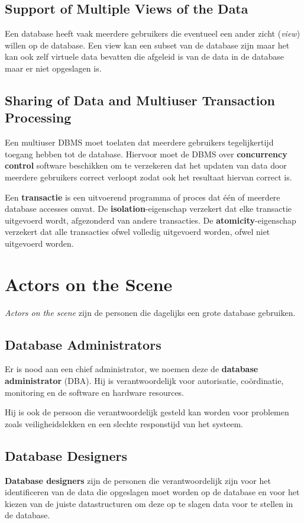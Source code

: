 \subsection{Support of Multiple Views of the Data}
Een database heeft vaak meerdere gebruikers die eventueel een ander zicht (\textit{view}) willen op de database. Een view kan een subset van de database zijn maar het kan ook zelf virtuele data bevatten die afgeleid is van de data in de database maar er niet opgeslagen is. 

\subsection{Sharing of Data and Multiuser Transaction Processing}
Een multiuser DBMS moet toelaten dat meerdere gebruikers tegelijkertijd toegang hebben tot de database. Hiervoor moet de DBMS over \textbf{concurrency control} software beschikken om te verzekeren dat het updaten van data door meerdere gebruikers correct verloopt zodat ook het resultaat hiervan correct is.

Een \textbf{transactie} is een uitvoerend programma of proces dat \'e\'en of meerdere database accesses omvat. De \textbf{isolation}-eigenschap verzekert dat elke transactie uitgevoerd wordt, afgezonderd van andere transacties. De \textbf{atomicity}-eigenschap verzekert dat alle transacties ofwel volledig uitgevoerd worden, ofwel niet uitgevoerd worden.


\newpage
\section{Actors on the Scene}
\textit{Actors on the scene} zijn de personen die dagelijks een grote database gebruiken.

\subsection{Database Administrators}
Er is nood aan een chief administrator, we noemen deze de \textbf{database administrator} (DBA). Hij is verantwoordelijk voor autorisatie, co\"ordinatie, monitoring en de software en hardware resources.

Hij is ook de persoon die verantwoordelijk gesteld kan worden voor problemen zoals veiligheidslekken en een slechte responstijd van het systeem.

\subsection{Database Designers}
\textbf{Database designers} zijn de personen die verantwoordelijk zijn voor het identificeren van de data die opgeslagen moet worden op de database en voor het kiezen van de juiste datastructuren om deze op te slagen data voor te stellen in de database.

